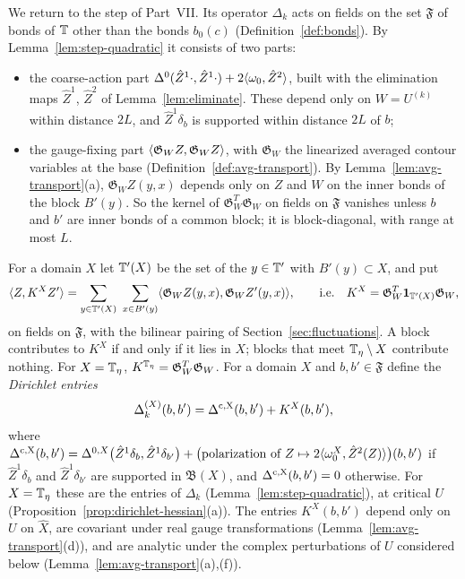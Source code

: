 We return to the step of Part~VII. Its operator $\Delta_k$ acts on fields on the set $\mathfrak F$ of bonds of $\mathbb T$ other than the bonds $b_0(c)$ (Definition~\ref{def:bonds}). By Lemma~\ref{lem:step-quadratic} it consists of two parts:
\begin{itemize}
\item the coarse-action part $\Delta^0(\hat Z^1\cdot,\hat Z^1\cdot)+2\langle \omega_0,\hat Z^2\rangle$, built with the elimination maps $\hat Z^1$, $\hat Z^2$ of Lemma~\ref{lem:eliminate}. These depend only on $W=U^{(k)}$ within distance $2L$, and $\hat Z^1\delta_b$ is supported within distance $2L$ of $b$;
\item the gauge-fixing part $\langle \mathfrak G_WZ,\mathfrak G_WZ\rangle$, with $\mathfrak G_W$ the linearized averaged contour variables at the base (Definition~\ref{def:avg-transport}). By Lemma~\ref{lem:avg-transport}(a), $\mathfrak G_WZ(y,x)$ depends only on $Z$ and $W$ on the inner bonds of the block $B'(y)$. So the kernel of $\mathfrak G_W^T\mathfrak G_W$ on fields on $\mathfrak F$ vanishes unless $b$ and $b'$ are inner bonds of a common block; it is block-diagonal, with range at most $L$.
\end{itemize}
For a domain $X$ let $\mathbb T'(X)$ be the set of the $y\in\mathbb T'$ with $B'(y)\subset X$, and put
\[
\ip Z{K^XZ'}=\sum_{y\in\T'(X)}\ \sum_{x\in B'(y)}\ip{\mathfrak G_WZ(y,x)}{\mathfrak G_WZ'(y,x)},\qquad\text{i.e.}\quad K^X=\mathfrak G_W^T\one_{\T'(X)}\mathfrak G_W ,
\]
on fields on $\mathfrak F$, with the bilinear pairing of Section~\ref{sec:fluctuations}. A block contributes to $K^X$ if and only if it lies in $X$; blocks that meet $\mathbb T_\eta\setminus X$ contribute nothing. For $X=\mathbb T_\eta$, $K^{\mathbb T_\eta}=\mathfrak G_W^T\mathfrak G_W$. For a domain $X$ and $b,b'\in\mathfrak F$ define the \emph{Dirichlet entries}
\[
\Delta^{(X)}_k(b,b')=\Delta^{\rm c,X}(b,b')+K^X(b,b'),
\]
where $\Delta^{\rm c,X}(b,b')=\Delta^{0,X}\big(\hat Z^1\delta_b,\hat Z^1\delta_{b'}\big)+\big(\text{polarization of }Z\mapsto2\langle \omega_0^X,\hat Z^2(Z)\rangle\big)(b,b')$ if $\hat Z^1\delta_b$ and $\hat Z^1\delta_{b'}$ are supported in $\mathfrak B(X)$, and $\Delta^{\rm c,X}(b,b')=0$ otherwise. For $X=\mathbb T_\eta$ these are the entries of $\Delta_k$ (Lemma~\ref{lem:step-quadratic}), at critical $U$ (Proposition~\ref{prop:dirichlet-hessian}(a)). The entries $K^X(b,b')$ depend only on $U$ on $\hat X$, are covariant under real gauge transformations (Lemma~\ref{lem:avg-transport}(d)), and are analytic under the complex perturbations of $U$ considered below (Lemma~\ref{lem:avg-transport}(a),(f)).

